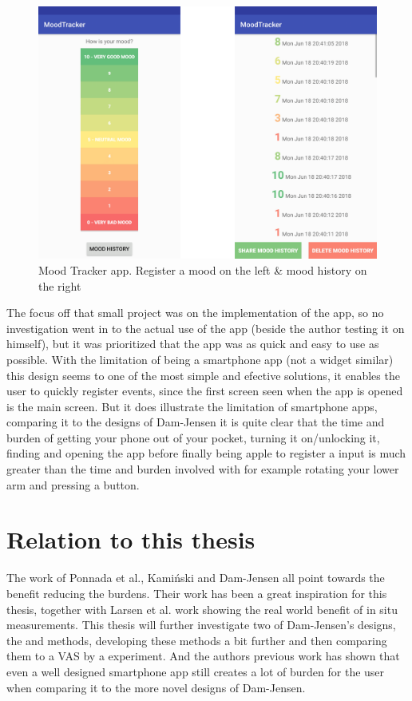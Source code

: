 \begin{figure}[h!]
    \centering
    \includegraphics[width=.8\textwidth]{figures/mood.png}
    \caption{Mood Tracker app. Register a mood on the left \& mood history on the right\cite{mood}}
    \label{mood}
\end{figure}

The focus off that small project was on the implementation of the app, so no investigation went in to the actual use of the app (beside the author testing it on himself), but it was prioritized that the app was as quick and easy to use as possible. With the limitation of being a smartphone app (not a widget similar) this design seems to one of the most simple and efective solutions, it enables the user to quickly register events, since the first screen seen when the app is opened is the main screen. But it does illustrate the limitation of smartphone apps, comparing it to the designs of Dam-Jensen it is quite clear that the time and burden of getting your phone out of your pocket, turning it on/unlocking it, finding and opening the app before finally being apple to register a input is much greater than the time and burden involved with for example rotating your lower arm and pressing a button. 



\section{Relation to this thesis}
The work of Ponnada et al., Kami\'nski and Dam-Jensen all point towards the benefit reducing the burdens. Their work has been a great inspiration for this thesis, together with Larsen et al. work showing the real world benefit of in situ measurements. This thesis will further investigate two of Dam-Jensen's designs, the  and  methods, developing these methods a bit further and then comparing them to a VAS by a  experiment. And the authors previous work has shown that even a well designed smartphone app still creates a lot of burden for the user when comparing it to the more novel designs of Dam-Jensen.